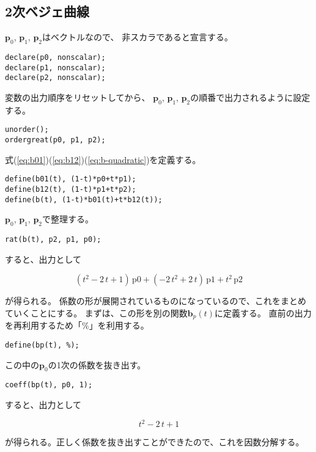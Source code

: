 \documentclass[dvipdfmx]{jsarticle}
\newcommand\VectBold[1]{\boldsymbol{#1}}
\newcommand\VectBold[1]{\symbf{#1}}
\newcommand\Vect[1]{\VectBold{#1}}
\begin{document}
\subsection{2次ベジェ曲線}

$\Vect{p}_0$, $\Vect{p}_1$, $\Vect{p}_2$はベクトルなので、
非スカラであると宣言する。

\begin{lstlisting}
declare(p0, nonscalar);
declare(p1, nonscalar);
declare(p2, nonscalar);
\end{lstlisting}

変数の出力順序をリセットしてから、
$\Vect{p}_0$, $\Vect{p}_1$, $\Vect{p}_2$の順番で出力されるように設定する。

\begin{lstlisting}
unorder();
ordergreat(p0, p1, p2);
\end{lstlisting}

式(\ref{eq:b01})(\ref{eq:b12})(\ref{eq:b-quadratic})を定義する。

\begin{lstlisting}
define(b01(t), (1-t)*p0+t*p1);
define(b12(t), (1-t)*p1+t*p2);
define(b(t), (1-t)*b01(t)+t*b12(t));
\end{lstlisting}

$\Vect{p}_0$, $\Vect{p}_1$, $\Vect{p}_2$で整理する。

\begin{lstlisting}
rat(b(t), p2, p1, p0);
\end{lstlisting}

すると、出力として

\[
\left(t^2-2\,t+1\right)\,\mathrm{p0}
+\left(-2\,t^2+2\,t\right)\,\mathrm{p1}
+t^2\,\mathrm{p2}
\]

が得られる。
係数の形が展開されているものになっているので、これをまとめていくことにする。
まずは、この形を別の関数$\Vect{b}_p\left(t\right)$に定義する。
直前の出力を再利用するため「\%」を利用する。

\begin{lstlisting}
define(bp(t), %);
\end{lstlisting}

この中の$\Vect{p}_0$の1次の係数を抜き出す。

\begin{lstlisting}
coeff(bp(t), p0, 1);
\end{lstlisting}

すると、出力として

\[
t^2-2\,t+1
\]

が得られる。正しく係数を抜き出すことができたので、これを因数分解する。
\end{document}
